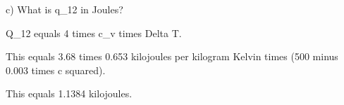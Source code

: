 c) What is q_12 in Joules?

Q_12 equals 4 times c_v times Delta T.

This equals 3.68 times 0.653 kilojoules per kilogram Kelvin times (500 minus 0.003 times c squared).

This equals 1.1384 kilojoules.